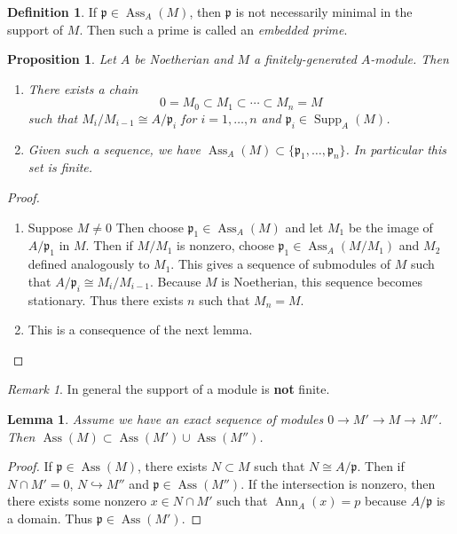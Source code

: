 \documentclass[leqno, openany]{memoir}
\newtheorem{prop}[thm]{Proposition}
\newtheorem{lem}[thm]{Lemma}
\theoremstyle{definition}
\newtheorem{defn}[thm]{Definition}
\theoremstyle{remark}
\newtheorem{rmk}[thm]{Remark}
\theoremstyle{plain}
\theoremstyle{definition}
\theoremstyle{remark}
\newcommand{\mf}[1]{\mathfrak{#1}}
\DeclareMathOperator{\Supp}{Supp}
\DeclareMathOperator{\Ann}{Ann}
\DeclareMathOperator{\Ass}{Ass}
\begin{document}
\begin{defn} If $\mf{p} \in \Ass_A(M)$, then $\mf{p}$ is not necessarily
minimal in the support of $M$. Then such a prime is called an \textit{embedded
prime}.  \end{defn}

\begin{prop} Let $A$ be Noetherian and $M$ a finitely-generated $A$-module.
    Then \begin{enumerate} \item There exists a chain \[ 0 = M_0 \subset M_1
    \subset \cdots \subset M_n = M \] such that $M_i / M_{i-1} \cong A /
    \mf{p}_i$ for $i = 1, \ldots, n$ and $\mf{p}_i \in \Supp_A(M)$.  \item
    Given such a sequence, we have $\Ass_A(M) \subset \{ \mf{p}_1, \ldots,
    \mf{p}_n \}$. In particular this set is finite.  \end{enumerate} \end{prop}

\begin{proof} \begin{enumerate} \item Suppose $M \neq 0$ Then choose $\mf{p}_1
    \in \Ass_A(M)$ and let $M_1$ be the image of $A / \mf{p}_1$ in $M$. Then if
    $M / M_1$ is nonzero, choose $\mf{p}_1 \in \Ass_A(M / M_1)$ and $M_2$
    defined analogously to $M_1$. This gives a sequence of submodules of $M$
    such that $A / \mf{p}_i \cong M_i / M_{i-1}$. Because $M$ is Noetherian,
    this sequence becomes stationary. Thus there exists $n$ such that $M_n =
    M$.  \item This is a consequence of the next lemma.  \end{enumerate}
\end{proof}

\begin{rmk} In general the support of a module is \textbf{not} finite.
\end{rmk}

\begin{lem} Assume we have an exact sequence of modules $0 \to M' \to M \to
M''$. Then $\Ass(M) \subset \Ass(M') \cup \Ass(M'')$.  \end{lem}

\begin{proof} If $\mf{p} \in \Ass(M)$, there exists $N \subset M$ such that $N
    \cong A / \mf{p}$. Then if $N \cap M' = 0$, $N \hookrightarrow M''$ and
    $\mf{p} \in \Ass(M'')$. If the intersection is nonzero, then there exists
    some nonzero $x \in N \cap M'$ such that $\Ann_A(x) = p$ because $A/\mf{p}$
    is a domain. Thus $\mf{p} \in \Ass(M')$.  \end{proof}
\end{document}
